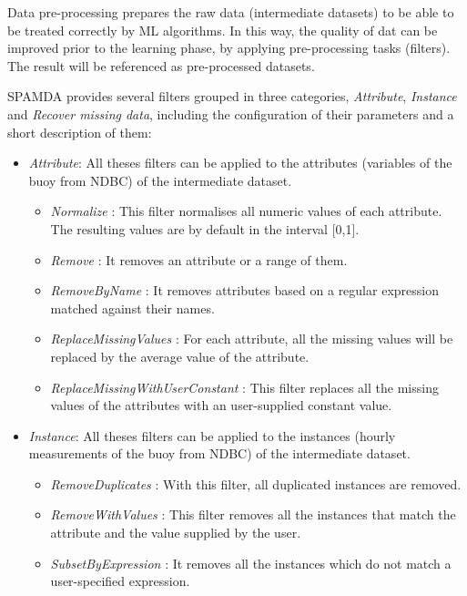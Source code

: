 \documentclass[energies,article,submit,moreauthors,pdftex]{Definitions/mdpi}
\begin{document}
				Data pre-processing prepares the raw data (intermediate datasets) to be able to be treated correctly by ML algorithms. In this way, the quality of dat can be improved prior to the learning phase, by applying pre-processing tasks (filters). The result will be referenced as pre-processed datasets.
				
				SPAMDA provides several filters grouped in three categories, \textit{Attribute}, \textit{Instance} and \textit{Recover missing data}, including the configuration of their parameters and a short description of them:
				
				\begin{itemize}[leftmargin=*,labelsep=5.8mm]

				 \item \textit{Attribute}: All theses filters can be applied to the attributes (variables of the buoy from NDBC) of the intermediate dataset.
				 
					\begin{itemize}[leftmargin=*,labelsep=5.8mm]
						\item \textit{Normalize} \cite{WEKA_Filter_Normalize}: This filter normalises all numeric values of each attribute. The resulting values are by default in the interval [0,1].
						\item \textit{Remove} \cite{WEKA_Filter_Remove}: It removes an attribute or a range of them.
						\item \textit{RemoveByName} \cite{WEKA_Filter_RemoveByName}: It removes attributes based on a regular expression matched against their names.
						\item \textit{ReplaceMissingValues} \cite{WEKA_Filter_ReplaceMissingValues}: For each attribute, all the missing values will be replaced by the average value of the attribute.
						\item \textit{ReplaceMissingWithUserConstant} \cite{WEKA_Filter_ReplaceMissingWithUserConstant}: This filter replaces all the missing values of the attributes with an user-supplied constant value.
					\end{itemize}
				 
				 \item \textit{Instance}: All theses filters can be applied to the instances (hourly measurements of the buoy from NDBC) of the intermediate dataset.
					\begin{itemize}[leftmargin=*,labelsep=5.8mm]
						\item \textit{RemoveDuplicates} \cite{WEKA_Filter_RemoveDuplicates}: With this filter, all duplicated instances are removed.
						\item \textit{RemoveWithValues} \cite{WEKA_Filter_RemoveWithValues}: This filter removes all the instances that match the attribute and the value supplied by the user.
						\item \textit{SubsetByExpression} \cite{WEKA_Filter_SubsetByExpression}: It removes all the instances which do not match a user-specified expression.
					\end{itemize}
				 

\end{itemize}
\end{document}

